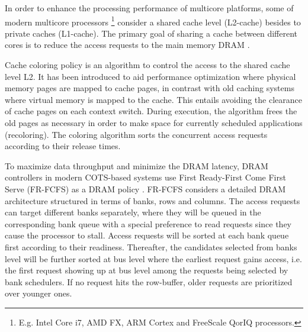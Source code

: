 In order to enhance the processing performance of multicore platforms, some of modern multicore processors \footnote{E.g. {Intel Core i7, AMD FX, ARM Cortex and FreeScale QorIQ} processors.} consider a shared cache level (L2-cache) besides to private caches (L1-cache). The primary goal of sharing a cache between different cores is to reduce the access requests to the main memory DRAM  %
 \cite{Nowotsch14}. %


Cache coloring policy \cite{Hyoseung13,Ye2014} is an algorithm to control the access to the shared cache level L2. It has been introduced to aid performance optimization where physical memory pages are mapped to cache pages, in contrast with old caching systems where virtual memory is mapped to the cache. This entails avoiding the clearance of cache pages on each context switch. 
During execution, the algorithm frees the old pages as necessary in order to make space for currently scheduled applications (recoloring). The coloring algorithm sorts the concurrent access requests according to their release times.  
 

To maximize data throughput and minimize the DRAM latency, DRAM controllers in modern COTS-based systems use {First Ready-First Come First Serve} (FR-FCFS) as a DRAM policy \cite{Rixner2000,Kim14}. FR-FCFS considers a detailed DRAM architecture structured in terms of banks, rows and columns. %
The access requests can target different banks separately, where they will be queued in the corresponding bank queue with a special preference to read requests since they cause the processor to stall. %
Access requests will be sorted at each bank queue first according to their readiness. Thereafter, the candidates selected from banks level will be further sorted at bus level where the earliest request gains access, i.e. the first request showing up at bus level among the requests being selected by bank schedulers. If no request hits the row-buffer, older requests are prioritized over younger ones.  

